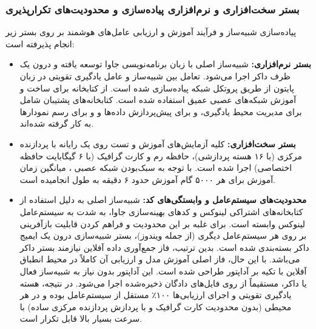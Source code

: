 \documentclass[oneside,openany,a4paper,12pt]{article}
\begin{document}
\subsubsection{بستر سخت‌افزاری و نرم‌افزاری پیاده‌سازی و محدودیت‌های تکرارپذیری}
پیاده‌سازی شبیه‌ساز  و فرآیند آموزش و ارزیابی عامل‌های هوشمند بر روی بستر زیر انجام پذیرفته است:
\begin{itemize}
    \item \textbf{بستر نرم‌افزاری:} شبیه‌ساز اصلی با زبان برنامه‌نویسی جاوا  توسعه یافته و درون یک ظرف داکر  اجرا می‌شود. تعامل بین شبیه‌ساز و عامل یادگیری تقویتی در زبان پایتون  از طریق پروتکل شبکه  پیاده‌سازی شده است. از کتابخانه  برای ساخت و آموزش شبکه‌های عصبی عمیق استفاده شده است. کتابخانه‌های پشتیبان شامل  برای مدیریت محیط یادگیری،  و  برای پیش‌پردازش داده‌ها و  و  برای رسم نمودارها به کار گرفته شده‌اند.
    \item \textbf{بستر سخت‌افزاری:} کلیه آزمایش‌های آموزش و تست روی یک رایانه با پردازنده مرکزی  (با ۱۶ هسته پردازشی)، حافظه رم  و کارت گرافیک  (با ۶ گیگابایت حافظه اختصاصی) اجرا شده است. با توجه به سبک‌بودن شبکه عصبی ، میانگین زمان آموزش برای هر ۵۰۰۰ گام آموزش حدود ۶ دقیقه به طول انجامیده است.
    \item \textbf{محدودیت‌های سیستم‌عامل و وابستگی‌های کد:} شبیه‌ساز اصلی  به دلیل استفاده از کتابخانه‌های اشتراکی لینوکس  و کدهای بهینه‌سازی جاوا، به شدت به سیستم‌عامل لینوکس وابسته است. برای غلبه بر این محدودیت و فراهم کردن قابلیت بازآفرینی بر روی هر سیستم‌عامل دیگری (از جمله ویندوز)، بستر شبیه‌سازی درون یک ایمیج داکر  بسته‌بندی شده است. بدین ترتیب، فاز جمع‌آوری داده آفلاین نیازمند بستر داکر می‌باشد. با این حال، فاز اصلی آموزش مدل و ارزیابی آن کاملاً در محیط انطباق آفلاین  با تکیه بر آداپتور  طراحی شده است. این آداپتور بدون نیاز به شبیه‌ساز فعال یا داکر، مستقیماً از روی فایل‌های دادگان  ذخیره‌شده اجرا می‌شود. در نتیجه، هسته یادگیری تقویتی و اجرای ارزیابی‌ها ۱۰۰٪ مستقل از سیستم‌عامل بوده و در هر محیطی (بدون محدودیت کارت گرافیک و با پردازش پردازنده مرکزی ساده) با سرعت بسیار بالا قابل تکرار است.
\end{itemize}
\end{document}
